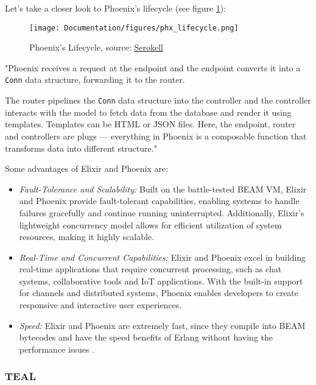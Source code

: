 Let's take a closer look to Phoenix's lifecycle (see figure \ref{fig:phx_lc}):\newline

\begin{figure}[htbp]
	\centering
	\texttt{[image: Documentation/figures/phx\_lifecycle.png]}  %
	\caption{Phoenix's Lifecycle, source: \href{https://serokell.io/blog/introduction-to-phoenix}{Serokell}}
	\label{fig:phx_lc}
\end{figure}

"Phoenix receives a request at the endpoint and the endpoint converts it into a \texttt{Conn} data structure, forwarding it to the router.\newline

The router pipelines the \texttt{Conn} data structure into the controller and the controller interacts with the model to fetch data from the database and render it using templates. Templates can be HTML or JSON files. Here, the endpoint, router and controllers are plugs — everything in Phoenix is a composable function that transforms data into different structure." \cite{phx}\newline


Some advantages of Elixir and Phoenix are:

\begin{itemize}
    \item \textit{Fault-Tolerance and Scalability:} Built on the battle-tested BEAM VM, Elixir and Phoenix provide fault-tolerant capabilities, enabling systems to handle failures gracefully and continue running uninterrupted. Additionally, Elixir's lightweight concurrency model allows for efficient utilization of system resources, making it highly scalable.
    \item \textit{Real-Time and Concurrent Capabilities:} Elixir and Phoenix excel in building real-time applications that require concurrent processing, such as chat systems, collaborative tools and IoT applications. With the built-in support for channels and distributed systems, Phoenix enables developers to create responsive and interactive user experiences.
    \item \textit{Speed:} Elixir and Phoenix are extremely fast, since they compile into BEAM bytecodes and have the speed benefits of Erlang without having the performance issues \cite{adv}.

\end{itemize}


\subsubsection{TEAL}

